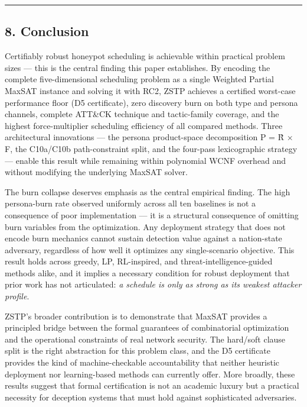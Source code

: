 \documentclass[
  11pt,
]{article}
\begin{document}
\begin{center}\rule{0.5\linewidth}{0.5pt}\end{center}

\hypertarget{conclusion}{%
\subsection{8. Conclusion}\label{conclusion}}

Certifiably robust honeypot scheduling is achievable within practical
problem sizes --- this is the central finding this paper establishes. By
encoding the complete five-dimensional scheduling problem as a single
Weighted Partial MaxSAT instance and solving it with RC2, ZSTP achieves
a certified worst-case performance floor (D5 certificate), zero
discovery burn on both type and persona channels, complete ATT\&CK
technique and tactic-family coverage, and the highest force-multiplier
scheduling efficiency of all compared methods. Three architectural
innovations --- the persona product-space decomposition P = R̂ × F, the
C10a/C10b path-constraint split, and the four-pass lexicographic
strategy --- enable this result while remaining within polynomial WCNF
overhead and without modifying the underlying MaxSAT solver.

The burn collapse deserves emphasis as the central empirical finding.
The high persona-burn rate observed uniformly across all ten baselines
is not a consequence of poor implementation --- it is a structural
consequence of omitting burn variables from the optimization. Any
deployment strategy that does not encode burn mechanics cannot sustain
detection value against a nation-state adversary, regardless of how well
it optimizes any single-scenario objective. This result holds across
greedy, LP, RL-inspired, and threat-intelligence-guided methods alike,
and it implies a necessary condition for robust deployment that prior
work has not articulated: \emph{a schedule is only as strong as its
weakest attacker profile}.

ZSTP's broader contribution is to demonstrate that MaxSAT provides a
principled bridge between the formal guarantees of combinatorial
optimization and the operational constraints of real network security.
The hard/soft clause split is the right abstraction for this problem
class, and the D5 certificate provides the kind of machine-checkable
accountability that neither heuristic deployment nor learning-based
methods can currently offer. More broadly, these results suggest that
formal certification is not an academic luxury but a practical necessity
for deception systems that must hold against sophisticated adversaries.
\end{document}
